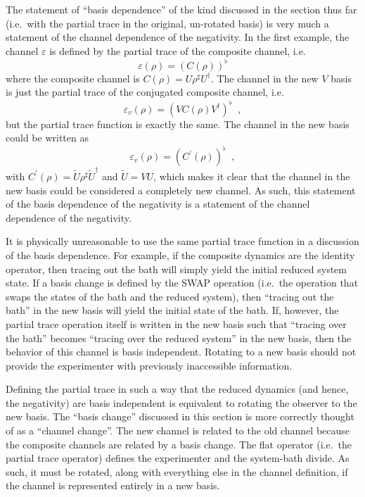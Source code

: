 The statement of ``basis dependence'' of the kind discussed in the section thus far (i.e.\ with the partial trace in the original, un-rotated basis) is very much a statement of the channel dependence of the negativity.  In the first example, the channel $\varepsilon$ is defined by the partial trace of the composite channel, i.e.\
$$
\varepsilon(\rho) = \left(C(\rho)\right)^\flat
$$
where the composite channel is $C(\rho) = U\rho^\sharp U^\dagger$.  The channel in the new $V$ basis is just the partial trace of the conjugated composite channel, i.e.\
$$
\varepsilon_v(\rho) = \left(VC(\rho)V^\dagger\right)^\flat\;\;,
$$
but the partial trace function is exactly the same.  The channel in the new basis could be written as 
$$
\varepsilon_v(\rho) = \left(C^\prime(\rho)\right)^\flat\;\;,
$$
with $C^\prime(\rho) = \tilde{U}\rho^\sharp \tilde{U}^\dagger$ and $\tilde{U}=VU$, which makes it clear that the channel in the new basis could be considered a completely new channel.  As such, this statement of the basis dependence of the negativity is a statement of the channel dependence of the negativity.

It is physically unreasonable to use the same partial trace function in a discussion of the basis dependence.  For example, if the composite dynamics are the identity operator, then tracing out the bath will simply yield the initial reduced system state.  If a basis change is defined by the SWAP operation (i.e.\ the operation that swaps the states of the bath and the reduced system), then ``tracing out the bath'' in the new basis will yield the initial state of the bath.  If, however, the partial trace operation itself is written in the new basis such that ``tracing over the bath'' becomes ``tracing over the reduced system'' in the new basis, then the behavior of this channel is basis independent.  Rotating to a new basis should not provide the experimenter with previously inaccessible information.  

Defining the partial trace in such a way that the reduced dynamics (and hence, the negativity) are basis independent is equivalent to rotating the observer to the new basis.  The ``basis change'' discussed in this section is more correctly thought of as a ``channel change''.  The new channel is related to the old channel because the composite channels are related by a basis change.  The flat operator (i.e.\ the partial trace operator) defines the experimenter and the system-bath divide.  As such, it must be rotated, along with everything else in the channel definition, if the channel is represented entirely in a new basis.  

